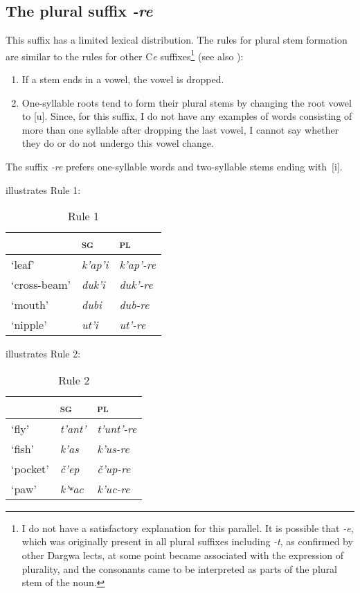 ﻿\documentclass[output=paper]{langsci/langscibook}
\begin{document}
\subsection{The plural suffix \emph{-re}}
\label{the-plural-suffix--re}

This suffix has a limited lexical distribution. The rules for plural
stem formation are similar to the rules for other C\emph{e}
suffixes\footnote{I do not have a satisfactory explanation for this
  parallel. It is possible that \emph{-e}, which was originally present
  in all plural suffixes including \emph{-t}, as confirmed by other
  Dargwa lects, at some point became associated with the expression of
  plurality, and the consonants came to be interpreted as parts of
  the plural stem of the noun.} (see also ):
\begin{enumerate}[topsep=\medskipamount,itemsep=0pt,partopsep=0pt,parsep=0pt,label={\arabic*})]
\item %
  If a stem ends in a vowel, the vowel is dropped.

\item %
  One-syllable roots tend to form their plural stems by changing the
root vowel to [u]. Since, for this suffix, I do not have any
examples of words consisting of more than one syllable after dropping
the last vowel, I cannot say whether they do or do not undergo this
vowel change.
\end{enumerate}

The suffix \emph{-re} prefers one-syllable words and two-syllable stems
ending with~[i].

 illustrates Rule 1:

\begin{table}[h]
  \caption{Rule 1}\label{tab:3:26}
\begin{tabular}{@{}lll@{}}
\toprule
& \textsc{sg} & \textsc{pl}\tabularnewline\midrule
`leaf' & \emph{k'ap'i} & \emph{k'ap'-re}\tabularnewline
`cross-beam' & \emph{duk'i} & \emph{duk'-re}\tabularnewline
`mouth' & \emph{dubi} & \emph{dub-re}\tabularnewline
`nipple' & \emph{ut'i} & \emph{ut'-re}\tabularnewline
\bottomrule
\end{tabular}
\end{table}

 illustrates Rule 2:\vspace{-\jot}


\begin{table}[H]
  \caption{Rule 2}\label{tab:3:27}
\begin{tabular}{@{}lll@{}}
\toprule
& \textsc{sg} & \textsc{pl}\tabularnewline \midrule
`fly' & \emph{t'ant'} & \emph{t'unt'-re}\tabularnewline
`fish' & \emph{k'as} & \emph{k'us-re}\tabularnewline
`pocket' & \emph{č'ep} & \emph{č'up-re}\tabularnewline
`paw' & \emph{k'ʷac} & \emph{k'uc-re}\tabularnewline
\bottomrule
\end{tabular}
\end{table}
\end{document}
